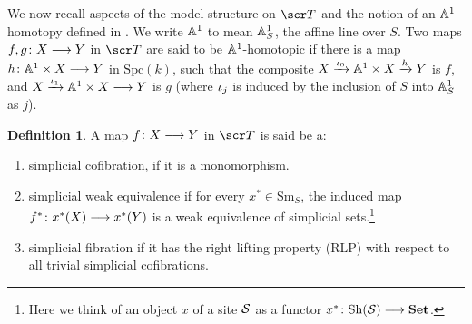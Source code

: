 \documentclass{amsart}
\theoremstyle{definition}
\newtheorem{defn}[thm]{Definition}
\begin{document}


We now recall aspects of the model structure on $\sT$ and the notion of an $\mathbb{A}^1$-homotopy defined in \cite{MV99}. We write $\mathbb{A}^1$ to mean $\mathbb{A}^1_S$, the affine line over $S$. Two maps $f, g \colon X \longrightarrow Y$ in $\sT$ are said to be $\mathbb{A}^1$-homotopic if there is a map $h \colon \mathbb{A}^1 \times X \longrightarrow Y$ in $\mathrm{Spc}(k)$, such that the composite $X \xrightarrow{\iota_0} \mathbb{A}^1 \times X \xrightarrow{h} Y$ is $f$, and $X \xrightarrow{\iota_1} \mathbb{A}^1 \times X \longrightarrow Y$ is $g$ (where $\iota_j$ is induced by the inclusion of $S$ into $\mathbb{A}^1_S$ as $j$). 

\begin{defn}
A map $f \colon X \longrightarrow Y$ in $\sT$ is said be a:
\begin{enumerate}
\item simplicial cofibration, if it is a monomorphism.
\item simplicial weak equivalence if for every $x^* \in \mathrm{Sm}_S$, the induced map\\ $f^* \colon x^*(X) \longrightarrow x^*(Y)$ is a weak equivalence of simplicial sets.\footnote{Here we think of an object $x$ of a site ${\mathcal{S}}$ as a functor $x^* \colon \mathrm{Sh}({\mathcal{S}}) \longrightarrow \mathbf{Set}$.}
\item simplicial fibration if it has the right lifting property (RLP) with respect to all trivial simplicial cofibrations.
\end{enumerate}
\end{defn}
\end{document}
